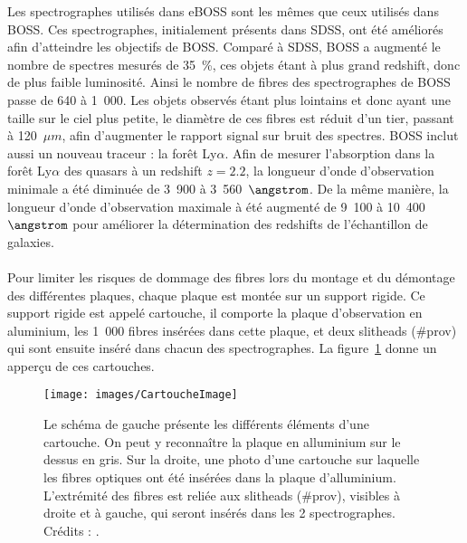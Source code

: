 \documentclass[11pt, twoside, a4paper, openright]{report}
\begin{document}
Les spectrographes utilisés dans eBOSS sont les mêmes que ceux utilisés dans BOSS. Ces spectrographes, initialement présents dans SDSS, ont été améliorés afin d'atteindre les objectifs de BOSS. Comparé à SDSS, BOSS a augmenté le nombre de spectres mesurés de 35~\%, ces objets étant à plus grand redshift, donc de plus faible luminosité. Ainsi le nombre de fibres des spectrographes de BOSS passe de 640 à 1~000. Les objets observés étant plus lointains et donc ayant une taille sur le ciel plus petite, le diamètre de ces fibres est réduit d'un tier, passant à 120~$\mu m$, afin d'augmenter le rapport signal sur bruit des spectres. BOSS inclut aussi un nouveau traceur : la forêt Ly$\alpha$. Afin de mesurer l'absorption dans la forêt Ly$\alpha$ des quasars à un redshift $z=2.2$, la longueur d'onde d'observation minimale a été diminuée de 3~900 à 3~560~$\angstrom$. De la même manière, la longueur d'onde d'observation maximale à été augmenté de 9~100 à 10~400~$\angstrom$ pour améliorer la détermination des redshifts de l'échantillon de galaxies.

\paragraph{} Pour limiter les risques de dommage des fibres lors du montage et du démontage des différentes plaques, chaque plaque est montée sur un support rigide. Ce support rigide est appelé cartouche, il comporte la plaque d'observation en aluminium, les 1~000 fibres insérées dans cette plaque, et deux slitheads (\#prov) qui sont ensuite inséré dans chacun des spectrographes. La figure~\ref{fig:CartoucheImage} donne un apperçu de ces cartouches.
\begin{figure}
  \centering
  \texttt{[image: images/CartoucheImage]}
  \caption{Le schéma de gauche présente les différents éléments d'une cartouche. On peut y reconnaître la plaque en alluminium sur le dessus en gris. Sur la droite, une photo d'une cartouche sur laquelle les fibres optiques ont été insérées dans la plaque d'alluminium. L'extrémité des fibres est reliée aux slitheads (\#prov), visibles à droite et à gauche, qui seront insérés dans les 2 spectrographes. Crédits : \cite{Smee2012}.}
  \label{fig:CartoucheImage}
\end{figure}
\end{document}
